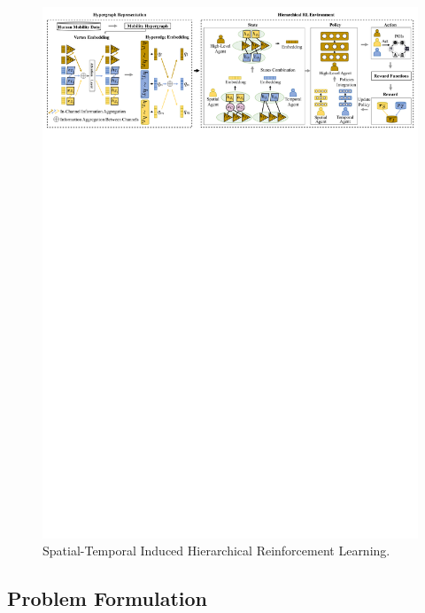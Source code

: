 \documentclass[letterpaper]{article} %
\begin{document}
\begin{figure}[!th]
  \centering
\includegraphics[width=1\linewidth]{frame88.pdf}
  \caption{Spatial-Temporal Induced Hierarchical Reinforcement Learning.}
  \label{fig:Loss}
\end{figure}

\subsection{Problem Formulation}
\end{document}
